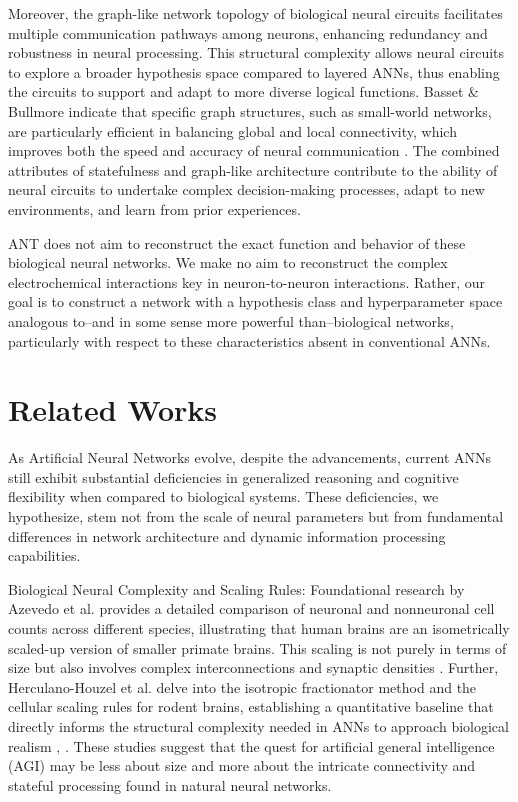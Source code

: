 \documentclass{article}
\begin{document}
\begin{multicols}{2}
	Moreover, the graph-like network topology of biological neural circuits facilitates multiple communication pathways among neurons, enhancing redundancy and robustness in neural processing. This structural complexity allows neural circuits to explore a broader hypothesis space compared to layered ANNs, thus enabling the circuits to support and adapt to more diverse logical functions. Basset \& Bullmore indicate that specific graph structures, such as small-world networks, are particularly efficient in balancing global and local connectivity, which improves both the speed and accuracy of neural communication \cite{basset2006}. The combined attributes of statefulness and graph-like architecture contribute to the ability of neural circuits to undertake complex decision-making processes, adapt to new environments, and learn from prior experiences.
	
	ANT does not aim to reconstruct the exact function and behavior of these biological neural networks. We make no aim to reconstruct the complex electrochemical interactions key in neuron-to-neuron interactions. Rather, our goal is to construct a network with a hypothesis class and hyperparameter space analogous to--and in some sense more powerful than--biological networks, particularly with respect to these characteristics absent in conventional ANNs.
	
	\section{Related Works}
	
	As Artificial Neural Networks evolve, despite the advancements, current ANNs still exhibit substantial deficiencies in generalized reasoning and cognitive flexibility when compared to biological systems. These deficiencies, we hypothesize, stem not from the scale of neural parameters but from fundamental differences in network architecture and dynamic information processing capabilities.
        
        Biological Neural Complexity and Scaling Rules: Foundational research by Azevedo et al. \cite{azevedo2009} provides a detailed comparison of neuronal and nonneuronal cell counts across different species, illustrating that human brains are an isometrically scaled-up version of smaller primate brains. This scaling is not purely in terms of size but also involves complex interconnections and synaptic densities \cite{azevedo2009}. Further, Herculano-Houzel et al. delve into the isotropic fractionator method and the cellular scaling rules for rodent brains, establishing a quantitative baseline that directly informs the structural complexity needed in ANNs to approach biological realism \cite{herculano2005}, \cite{herculano2006}. These studies suggest that the quest for artificial general intelligence (AGI) may be less about size and more about the intricate connectivity and stateful processing found in natural neural networks.
        

\end{multicols}
\end{document}
